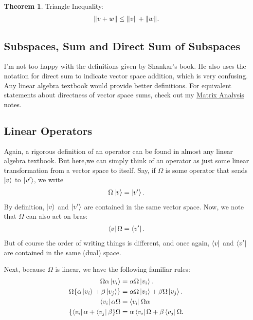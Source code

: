 \documentclass{book}
\theoremstyle{definition}
\newtheorem{thm}{Theorem}[section]
\begin{document}
\begin{thm}
	Triangle Inequality:
	\begin{align}
	\norm{v+w} \leq \norm{v} + \norm{w}.
	\end{align}
\end{thm}



\subsection{Subspaces, Sum and Direct Sum of Subspaces}
I'm not too happy with the definitions given by Shankar's book. He also uses the notation for direct sum to indicate vector space addition, which is very confusing. Any linear algebra textbook would provide better definitions. For equivalent statements about directness of vector space sums, check out my \href{https://huanqbui.com/LaTeX\%20projects/Matrix_Analysis/HuanBui_MatrixAnalysis.pdf}{Matrix Analysis} notes. 




\subsection{Linear Operators}
Again, a rigorous definition of an operator can be found in almost any linear algebra textbook. But here,we can simply think of an operator as just some linear transformation from a vector space to itself. Say, if $\Omega$ is some operator that sends $\ket{v}$ to $\ket{v'}$, we write
\begin{align}
\Omega\ket{v} = \ket{v'}.
\end{align}
By definition, $\ket{v}$ and $\ket{v'}$ are contained in the same vector space. Now, we note that $\Omega$ can also act on bras:
\begin{align}
\bra{v}\Omega = \bra{v'}.
\end{align}
But of course the order of writing things is different, and once again, $\bra{v}$ and $\bra{v'}$ are contained in the same (dual) space. 


Next, because $\Omega$ is linear, we have the following familiar rules:
\begin{align}
\Omega \alpha \ket{v_i} &= \alpha\Omega \ket{v_i}.\\
\Omega \{ \alpha \ket{v_i} + \beta\ket{v_j} \} &= \alpha\Omega\ket{v_i} + \beta\Omega \ket{v_j}.\\
\bra{v_i}\alpha\Omega &= \bra{v_i}\Omega \alpha\\
\{\bra{v_i}\alpha + \bra{v_j}\beta \}\Omega &= \alpha\bra{v_i}\Omega + \beta \bra{v_j}\Omega.
\end{align}
\end{document}
